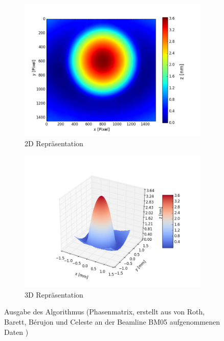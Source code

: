 \begin{figure}[h!]
	\centering
	\begin{subfigure}[b]{0.45\textwidth}
		\centering
		\includegraphics[width=\textwidth]{img/2D_E10001_edf_ref_start0001_1-10_edf}
		\caption[2D Ausgabe]{2D Repräsentation}
		\label{fig:ausgabe_2d}
	\end{subfigure}
	\begin{subfigure}[b]{0.45\textwidth}
		\centering
		\includegraphics[width=\textwidth]{img/3D_E10001_edf_ref_start0001_1-10_edf}
		\caption[3D Ausgabe]{3D Repräsentation}
		\label{fig:ausgabe_3d}
	\end{subfigure}
	\caption[Ausgabe]{Ausgabe des Algorithmus (Phasenmatrix, erstellt aus von Roth, Barett, Bérujon und Celeste an der Beamline BM05 aufgenommenen Daten \cite{RBB+17})}
	\label{fig:ausgabebild}
\end{figure}

